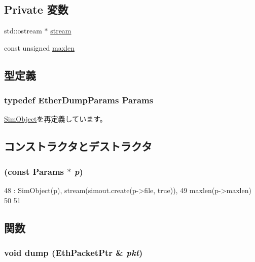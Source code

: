 \subsection*{Private 変数}
\begin{DoxyCompactItemize}
\item 
std::ostream $\ast$ \hyperlink{classEtherDump_adc3bdd1632f41d809c78a20c0733715c}{stream}
\item 
const unsigned \hyperlink{classEtherDump_a116bcd76790af971de65d742bdb8feac}{maxlen}
\end{DoxyCompactItemize}


\subsection{型定義}
\hypertarget{classEtherDump_a1c09075a361c5596c4f4523d9b570438}{
\subsubsection[{Params}]{\setlength{\rightskip}{0pt plus 5cm}typedef EtherDumpParams {\bf Params}}}
\label{classEtherDump_a1c09075a361c5596c4f4523d9b570438}


\hyperlink{classSimObject_a0f0761d2db586a23bb2a2880b8f387bb}{SimObject}を再定義しています。

\subsection{コンストラクタとデストラクタ}
\hypertarget{classEtherDump_aa69b0ba907f0f8cfcd7e311bd7da83ac}{
\subsubsection[{EtherDump}]{ (const {\bf Params} $\ast$ {\em p})}}
\label{classEtherDump_aa69b0ba907f0f8cfcd7e311bd7da83ac}



\begin{DoxyCode}
48     : SimObject(p), stream(simout.create(p->file, true)),
49       maxlen(p->maxlen)
50 {
51 }
\end{DoxyCode}


\subsection{関数}
\hypertarget{classEtherDump_a4fd2deacb5bb2820bdba7d369a17e72f}{
\subsubsection[{dump}]{\setlength{\rightskip}{0pt plus 5cm}void dump ({\bf EthPacketPtr} \& {\em pkt})}}
\label{classEtherDump_a4fd2deacb5bb2820bdba7d369a17e72f}



